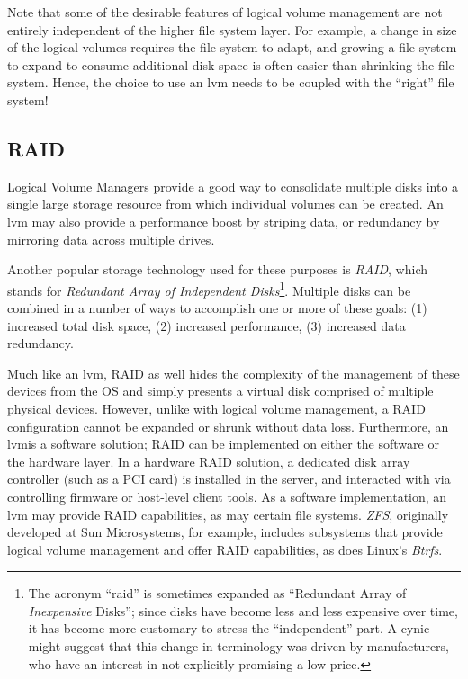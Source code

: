 Note that some of the desirable features of logical
volume management are not entirely independent of the
higher file system layer.  For example, a change in
size of the logical volumes requires the file system
to adapt, and growing a file system to expand to
consume additional disk space is often easier than
shrinking the file system.  Hence, the choice to use
an \gls{lvm} needs to be coupled with the ``right'' file
system!

\subsection{RAID}
\label{file systems:storage-models:dividing-and-combining-disks:raid}

Logical Volume Managers provide a good way to
consolidate multiple disks into a single large storage
resource from which individual volumes can be created.
An \gls{lvm} may also provide a performance boost by
striping data, or redundancy by mirroring data across
multiple drives.

Another popular storage technology used for these
purposes is {\em RAID}, which stands for {\em
Redundant Array of Independent Disks}\footnote{The
acronym ``\gls{raid}'' is sometimes expanded as ``Redundant
Array of {\em Inexpensive} Disks''; since disks have
become less and less expensive over time, it has
become more customary to stress the ``independent''
part.  A cynic might suggest that this change in
terminology was driven by manufacturers, who have an
interest in not explicitly promising a low price.}.
Multiple disks can be combined in a number of ways to
accomplish one or more of these goals: (1) increased
total disk space, (2) increased performance, (3)
increased data redundancy.

Much like an \gls{lvm}, RAID as well hides the
complexity of the management of these devices from the
OS and simply presents a virtual disk comprised of
multiple physical devices.  However, unlike with
logical volume management, a RAID configuration cannot
be expanded or shrunk without data loss.  Furthermore,
an \gls{lvm}is a software solution; RAID can be
implemented on either the software or the hardware
layer.  In a hardware RAID
solution, a dedicated disk array controller (such as a
PCI card) is installed in the server, and
interacted with via controlling firmware or host-level
client tools.  As a software implementation, an
\gls{lvm} may provide RAID
capabilities, as may certain file systems.  {\em
ZFS}, originally developed at Sun
Microsystems, for example,
includes subsystems that provide logical volume
management and offer RAID capabilities, as does
Linux's {\em Btrfs}.


